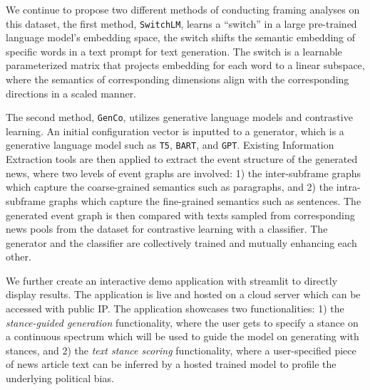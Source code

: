 We continue to propose two different methods of conducting framing analyses on this dataset, the first method, \texttt{SwitchLM}, learns a ``switch'' in a large pre-trained language model's embedding space, the switch shifts the semantic embedding of specific words in a text prompt for text generation. The switch is a learnable parameterized matrix that projects embedding for each word to a linear subspace, where the semantics of corresponding dimensions align with the corresponding directions in a scaled manner.

The second method, \texttt{GenCo}, utilizes generative language models and contrastive learning. An initial configuration vector is inputted to a generator, which is a generative language model such as \texttt{T5}, \texttt{BART}, and \texttt{GPT}. Existing Information Extraction tools are then applied to extract the event structure of the generated news, where two levels of event graphs are involved: 1) the inter-subframe graphs which capture the coarse-grained semantics such as paragraphs, and 2) the intra-subframe graphs which capture the fine-grained semantics such as sentences. The generated event graph is then compared with texts sampled from corresponding news pools from the dataset for contrastive learning with a classifier. The generator and the classifier are collectively trained and mutually enhancing each other.

We further create an interactive demo application with streamlit to directly display results. The application is live and hosted on a cloud server which can be accessed with public IP. The application showcases two functionalities: 1) the \textit{stance-guided generation} functionality, where the user gets to specify a stance on a continuous spectrum which will be used to guide the model on generating with stances, and 2) the \textit{text stance scoring} functionality, where a user-specified piece of news article text can be inferred by a hosted trained model to profile the underlying political bias.
